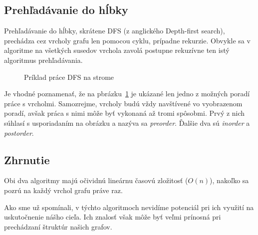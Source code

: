 \subsection{Prehľadávanie do hĺbky}

Prehľadávanie do hĺbky, skrátene DFS (z anglického Depth-first search), prechádza cez vrcholy grafu len pomocou cyklu, prípadne rekurzie. Obvykle sa v algoritme na všetkých susedov vrchola zavolá postupne rekuzívne ten istý algoritmus prehľadávania.\newline

\begin{figure}[H]
  \caption{Príklad práce DFS na strome}
  \label{DFS_priklad}
\end{figure}

Je vhodné poznamenať, že na pbrázku~\ref{DFS_priklad} je ukázané len jedno z možných poradí práce s vrcholmi. Samozrejme, vrcholy budú vždy navštívené vo vyobrazenom poradí, avšak práca s nimi môže byť vykonaná až tromi spôsobmi. Prvý z nich súhlasí s usporiadaním na obrázku a nazýva sa \textit{preorder}. Ďalšie dva sú \textit{inorder} a \textit{postorder}.\newline


\subsection{Zhrnutie}

Obi dva algoritmy majú očividnú lineárnu časovú zložitosť ($O(n)$), nakoľko sa pozrú na každý vrchol grafu práve raz.\newline

Ako sme už spomínali, v týchto algoritmoch nevidíme potenciál pri ich využití na uskutočnenie nášho cieľa. Ich znalosť však môže byť veľmi prínosná pri prechádzaní štruktúr našich grafov.\newline


